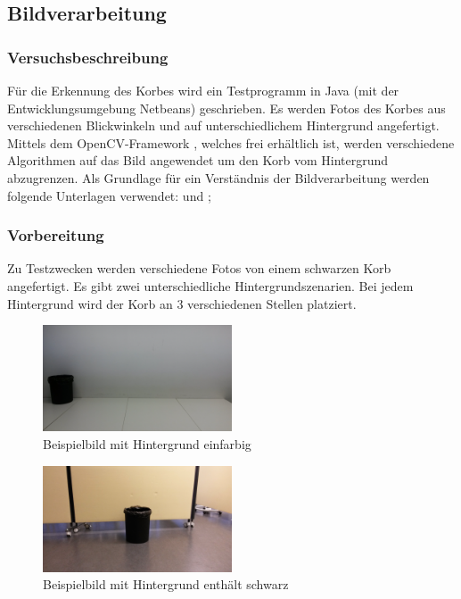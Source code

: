 \subsection{Bildverarbeitung}

\subsubsection{Versuchsbeschreibung}
Für die Erkennung des Korbes wird ein Testprogramm in Java (mit der 
Entwicklungsumgebung Netbeans) geschrieben. Es werden Fotos des Korbes aus 
verschiedenen Blickwinkeln und auf unterschiedlichem Hintergrund angefertigt. 
Mittels dem OpenCV-Framework \cite{img:netbeans}, welches frei erhältlich ist, 
werden verschiedene Algorithmen auf das Bild angewendet um den Korb vom 
Hintergrund abzugrenzen. Als Grundlage für ein Verständnis der 
Bildverarbeitung werden folgende Unterlagen verwendet: \cite{img:info} und 
\cite{img:help};

\subsubsection{Vorbereitung}
Zu Testzwecken werden verschiedene Fotos von einem schwarzen Korb angefertigt. 
Es gibt zwei unterschiedliche Hintergrundszenarien. Bei jedem Hintergrund wird der 
Korb an 3 verschiedenen Stellen platziert.

\begin{figure}[h!]
    \centering
    \includegraphics[width=0.5\textwidth]{fig/korb4.jpg}
    \caption{Beispielbild mit Hintergrund einfarbig}
    \label{fig:Korb_HEinfarbig}
\end{figure}

\begin{figure}[h!]
    \centering
    \includegraphics[width=0.5\textwidth]{fig/korb1.jpg}
    \caption{Beispielbild mit Hintergrund enthält schwarz}
    \label{fig:Korb_HSchwarz}
\end{figure}

